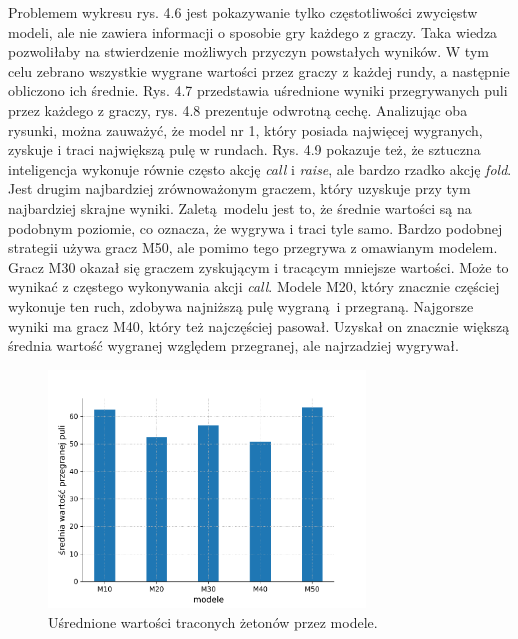 \documentclass[12pt,oneside,a4paper]{report}
\begin{document}
Problemem wykresu rys. 4.6 jest pokazywanie tylko częstotliwości zwycięstw modeli, ale nie zawiera
informacji o sposobie gry każdego z graczy. 
Taka wiedza pozwoliłaby na stwierdzenie możliwych przyczyn powstałych
wyników.
W tym celu zebrano wszystkie wygrane wartości przez graczy z każdej rundy, a następnie
obliczono ich średnie. Rys. 4.7 przedstawia uśrednione wyniki przegrywanych puli przez każdego z
graczy, rys. 4.8 prezentuje odwrotną cechę. Analizując oba rysunki, można zauważyć, że model
nr 1, który posiada najwięcej wygranych, zyskuje i traci największą pulę w rundach.
Rys. 4.9 pokazuje też, że sztuczna inteligencja wykonuje równie często akcję \emph{call}
i \emph{raise}, ale bardzo rzadko akcję \emph{fold}. Jest
drugim najbardziej zrównoważonym graczem, który uzyskuje przy tym najbardziej skrajne wyniki.
Zaletą modelu jest to, że 
średnie wartości są na podobnym poziomie, co oznacza, że wygrywa i traci tyle samo. Bardzo podobnej
strategii używa gracz M50, ale pomimo tego przegrywa z omawianym modelem.
Gracz M30 okazał się graczem zyskującym i tracącym mniejsze wartości.
Może to wynikać z częstego wykonywania akcji \emph{call}. Modele M20, który znacznie
częściej wykonuje ten ruch, zdobywa najniższą pulę wygraną i przegraną.
Najgorsze wyniki ma gracz M40, który też najczęściej pasował. Uzyskał
on znacznie większą średnia wartość wygranej względem przegranej, ale najrzadziej wygrywał.


\newpage


\begin{figure}[!ht]
  \centering
  \includegraphics[width=0.75\textwidth]{./img/mecze_ps.pdf}
  \caption{Uśrednione wartości traconych żetonów przez modele.}
\end{figure}
\end{document}
